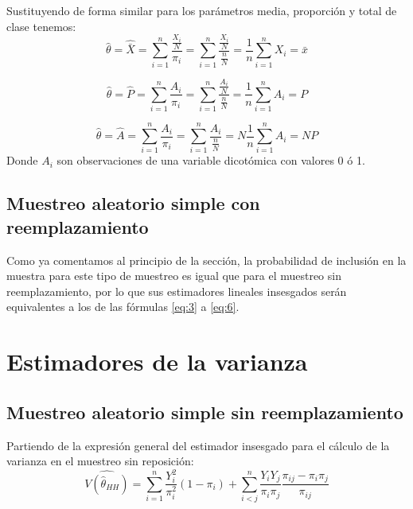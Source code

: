 Sustituyendo de forma similar para los parámetros media, proporción y total de clase tenemos:\\
\begin{equation}\label{eq:4}
    \hat{\theta} = \hat{\bar{X}} = \sum_{i=1}^{n}\frac{\frac{X_i}{N}}{\pi_i} = \sum_{i=1}^{n}\frac{\frac{X_i}{N}}{\frac{n}{N}} = \frac{1}{n}\sum_{i=1}^{n}X_i = \bar{x}
\end{equation}

\begin{equation}\label{eq:5}
    \hat{\theta} = \hat{P} = \sum_{i=1}^{n}\frac{A_i}{\pi_i} = \sum_{i=1}^{n}\frac{\frac{A_i}{N}}{\frac{n}{N}} = \frac{1}{n}\sum_{i=1}^{n}A_i = P
\end{equation}

\begin{equation}\label{eq:6}
    \hat{\theta} = \hat{A} = \sum_{i=1}^{n}\frac{A_i}{\pi_i} = \sum_{i=1}^{n}\frac{A_i}{\frac{n}{N}} = N\frac{1}{n}\sum_{i=1}^{n}A_i = NP
\end{equation}
Donde $A_i$ son observaciones de una variable dicotómica con valores 0 ó 1.\\

\subsection{Muestreo aleatorio simple con reemplazamiento}
Como ya comentamos al principio de la sección, la probabilidad de inclusión en la muestra para este tipo de muestreo es igual que para el muestreo sin reemplazamiento, por lo que sus estimadores lineales insesgados serán equivalentes a los de las fórmulas \ref{eq:3} a \ref{eq:6}.\\


\section{Estimadores de la varianza} \label{sect:3.3}
\subsection{Muestreo aleatorio simple sin reemplazamiento}

Partiendo de la expresión general del estimador insesgado para el cálculo de la varianza en el muestreo sin reposición:\\

\begin{equation}\label{eq:7}
    \widehat{V(\hat{\theta}_{HH})} = \sum_{i=1}^{n}\frac{Y_i^2}{\pi_i^2}(1-\pi_i) +  \sum_{i<j}^{n}\frac{Y_iY_j}{\pi_i\pi_j}\frac{\pi_{ij}-\pi_i\pi_j}{\pi_{ij}}
\end{equation}

